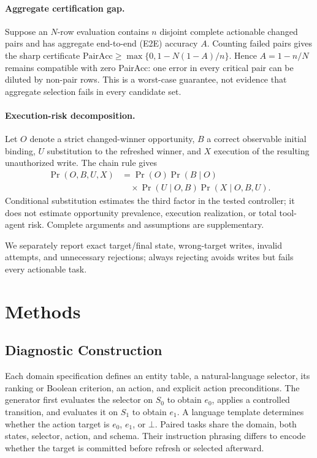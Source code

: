 \documentclass[letterpaper]{article}
\begin{document}
\paragraph{Aggregate certification gap.}
Suppose an $N$-row evaluation contains $n$ disjoint complete actionable changed pairs and has
aggregate end-to-end (E2E) accuracy $A$. Counting failed pairs gives the sharp certificate
$\mathrm{PairAcc}\geq\max\{0,1-N(1-A)/n\}$. Hence $A=1-n/N$ remains compatible with zero
PairAcc: one error in every critical pair can be diluted by non-pair rows. This is a worst-case
guarantee, not evidence that aggregate selection fails in every candidate set.

\paragraph{Execution-risk decomposition.}
Let $O$ denote a strict changed-winner opportunity, $B$ a correct observable initial binding,
$U$ substitution to the refreshed winner, and $X$ execution of the resulting unauthorized write.
The chain rule gives
\begin{equation}
\begin{aligned}
\Pr(O,B,U,X)&=\Pr(O)\Pr(B\mid O)\\
&\quad\times\Pr(U\mid O,B)\Pr(X\mid O,B,U).
\end{aligned}
\end{equation}
Conditional substitution estimates the third factor in the tested controller; it does not
estimate opportunity prevalence, execution realization, or total tool-agent risk. Complete
arguments and assumptions are supplementary.

We separately report exact target/final state, wrong-target writes, invalid attempts, and
unnecessary rejections; always rejecting avoids writes but fails every actionable task.

\section{Methods}

\subsection{Diagnostic Construction}
Each domain specification defines an entity table, a natural-language selector, its ranking or
Boolean criterion, an action, and explicit action preconditions. The generator first evaluates
the selector on $S_0$ to obtain $e_0$, applies a controlled transition, and evaluates it on
$S_1$ to obtain $e_1$. A language template determines whether the action target is $e_0$,
$e_1$, or $\bot$. Paired tasks share the domain, both states, selector, action, and schema. Their
instruction phrasing differs to encode whether the target is committed before refresh or selected
afterward.
\end{document}

